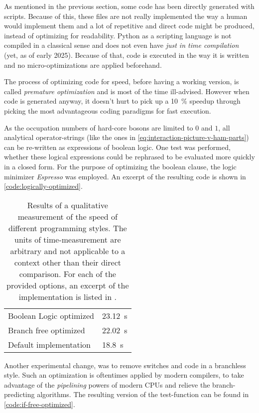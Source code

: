 As mentioned in the previous section, some code has been directly generated with scripts.
Because of this, these files are not really implemented the way a human would implement them and a lot of repetitive and direct code might be produced, instead of optimizing for readability.
Python as a scripting language is not compiled in a classical sense and does not even have \emph{just in time compilation} (yet, as of early 2025).
Because of that, code is executed in the way it is written and no micro-optimizations are applied beforehand.

The process of optimizing code for speed, before having a working version, is called \emph{premature optimization} and is most of the time ill-advised.
However when code is generated anyway, it doesn't hurt to pick up a \SI{10}{\percent} speedup through picking the most advantageous coding paradigms for fast execution.

As the occupation numbers of hard-core bosons are limited to $0$ and $1$, all analytical operator-strings (like the ones in \autoref{eq:interaction-picture-v-ham-parts}) can be re-written as expressions of boolean logic.
One test was performed, whether these logical expressions could be rephrased to be evaluated more quickly in a closed form. 
For the purpose of optimizing the boolean clause, the logic minimizer \emph{Espresso} \cite{espresso} was employed.
An excerpt of the resulting code is shown in \ref{code:logically-optimized}.

\begin{table}[htbp]
    \centering
    \begin{tabular}{l|l} 
        \toprule
             Boolean Logic optimized & \SI{23.12}{\second}\\
             Branch free optimized & \SI{22.02}{\second}\\
             Default implementation & \SI{18.8}{\second}\\
        \bottomrule
    \end{tabular}
    \vspace{0.5cm}
    \caption{
        Results of a qualitative measurement of the speed of different programming styles.
        The units of time-measurement are arbitrary and not applicable to a context other than their direct comparison.
        For each of the provided options, an excerpt of the implementation is listed in .
    }
    \label{table:style-optimizations-runtime}
\end{table}

Another experimental change, was to remove switches and code in a branchless style.
Such an optimization is oftentimes applied by modern compilers, to take advantage of the \emph{pipelining} powers of modern CPUs and relieve the branch-predicting algorithms.
The resulting version of the test-function can be found in \ref{code:if-free-optimized}.

